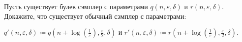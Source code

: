 Пусть существует булев сэмплер с параметрами $q(n, \varepsilon, \delta)$ и $r(n, \varepsilon,
\delta)$. Докажите, что существует обычный сэмплер с параметрами:

$q'(n, \varepsilon, \delta) \coloneqq
q\left(n + \log\left(\frac{1}{\varepsilon}\right), \frac{\varepsilon}{2}, \delta\right)$ и
$r'(n, \varepsilon, \delta) \coloneqq
r\left(n + \log\left(\frac{1}{\varepsilon}\right), \frac{\varepsilon}{2}, \delta\right)$. 
